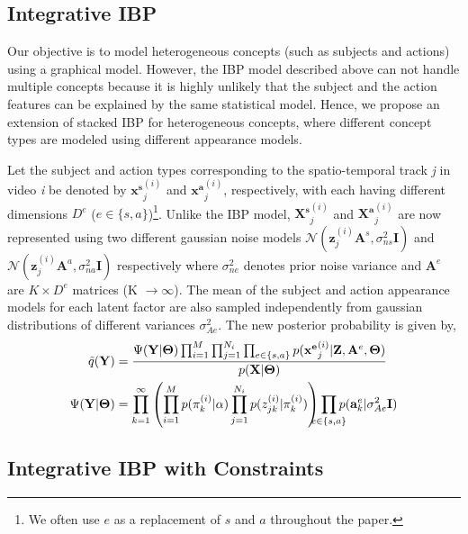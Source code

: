 \documentclass[runningheads]{llncs}
\begin{document}
\subsection{Integrative IBP}
\label{sec:mmibp}

Our objective is to model heterogeneous concepts (such as subjects and actions) using a graphical model. However, the IBP model described above can not handle multiple concepts because it is highly unlikely that the subject and the action features can be explained by the same statistical model. Hence, we propose an extension of stacked IBP for heterogeneous concepts, where different concept types are modeled using different appearance models.

Let the subject and action types corresponding to the spatio-temporal track \textit{j} in video \textit{i} be denoted by $\mathbf{x^s}^{(i)}_j$ and $\mathbf{x^a}^{(i)}_j$, respectively, with each having different dimensions $D^e$ ($e \in \{s,a\}$)\footnote{We often use $e$ as a replacement of $s$ and $a$ throughout the paper.}. Unlike the IBP model, $\mathbf{X^s}^{(i)}_j$ and $\mathbf{X^a}^{(i)}_j$ are now represented using two different gaussian noise models $\mathcal{N}(\mathbf{z}^{(i)}_{j}\mathbf{A}^s, \sigma_{ns}^2\mathbf{I})$ and $\mathcal{N}(\mathbf{z}^{(i)}_{j}\mathbf{A}^a, \sigma_{na}^2\mathbf{I})$ respectively where $\sigma_{ne}^2$ denotes prior noise variance and $\mathbf{A}^e$ are $K \times D^e$ matrices (K $\rightarrow \infty$). The mean of the subject and action appearance models for each latent factor are also sampled independently from gaussian distributions of different variances $\sigma_{Ae}^2$. The new posterior probability is given by,
\begin{equation}
\begin{aligned}
\label{eq3.3a}
\tilde{q}(\mathbf{Y}) &= \frac{\Psi(\mathbf{Y} | \mathbf{\Theta}) \prod_{i=1}^M \prod_{j=1}^{N_i}\prod_{e\in\{s,a\}}p(\mathbf{x^e}^{(i)}_j | \mathbf{Z},\mathbf{A}^e, \mathbf{\Theta})}{p(\mathbf{X} | \mathbf{\Theta})} \\
{\Psi}(\mathbf{Y} | \mathbf{\Theta}) &= \prod_{k=1}^\infty \left(\prod_{i=1}^M  p(\pi_k^{(i)} | \alpha) \prod_{j=1}^{N_i} p(z_{jk}^{(i)} | \pi_k^{(i)} )\right) \prod_{\mathclap{e\in\{s,a\}}} p(\mathbf{a}^e_{k} | \sigma_{Ae}^2\mathbf{I})
\end{aligned}
\end{equation}

\subsection{Integrative IBP with Constraints}
\label{sec:weak-supervised_constraints}
\end{document}
